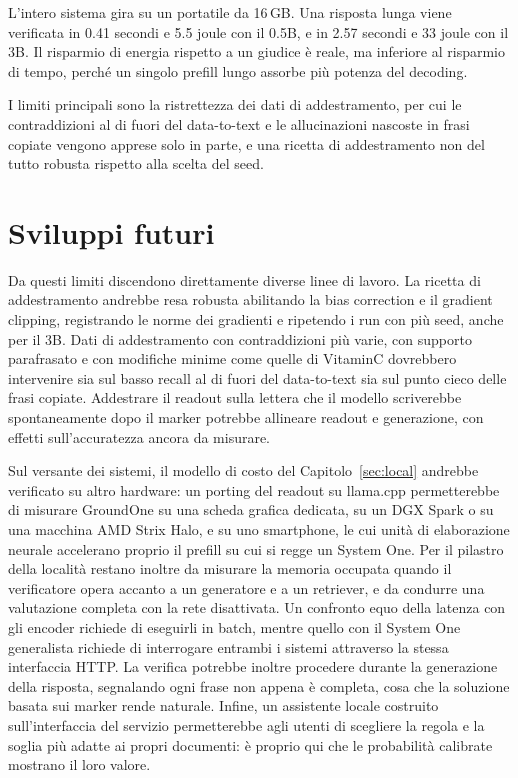 L'intero sistema gira su un portatile da 16\,GB. Una risposta lunga viene verificata in 0.41 secondi e 5.5 joule con il
0.5B, e in 2.57 secondi e 33 joule con il 3B. Il risparmio di energia rispetto a un giudice è reale, ma inferiore al
risparmio di tempo, perché un singolo prefill lungo assorbe più potenza del decoding.

I limiti principali sono la ristrettezza dei dati di addestramento, per cui le contraddizioni al di fuori del
data-to-text e le allucinazioni nascoste in frasi copiate vengono apprese solo in parte, e una ricetta di addestramento
non del tutto robusta rispetto alla scelta del seed.

\section{Sviluppi futuri}
\label{sec:concl-future}

Da questi limiti discendono direttamente diverse linee di lavoro. La ricetta di addestramento andrebbe resa robusta
abilitando la bias correction e il gradient clipping, registrando le norme dei gradienti e ripetendo i run con più seed,
anche per il 3B. Dati di addestramento con contraddizioni più varie, con supporto parafrasato e con modifiche minime come
quelle di VitaminC dovrebbero intervenire sia sul basso recall al di fuori del data-to-text sia sul punto cieco delle
frasi copiate. Addestrare il readout sulla lettera che il modello scriverebbe spontaneamente dopo il marker potrebbe
allineare readout e generazione, con effetti sull'accuratezza ancora da misurare.

Sul versante dei sistemi, il modello di costo del Capitolo~\ref{sec:local} andrebbe verificato su altro hardware: un
porting del readout su llama.cpp permetterebbe di misurare GroundOne su una scheda grafica dedicata, su un DGX Spark o
su una macchina AMD Strix Halo, e su uno smartphone, le cui unità di elaborazione neurale accelerano proprio il prefill
su cui si regge un System One. Per il pilastro della località restano inoltre da misurare la memoria occupata quando il verificatore
opera accanto a un generatore e a un retriever, e da condurre una valutazione completa con la rete disattivata. Un
confronto equo della latenza con gli encoder richiede di eseguirli in batch, mentre quello con il System One generalista
richiede di interrogare entrambi i sistemi attraverso la stessa interfaccia HTTP. La verifica potrebbe inoltre procedere
durante la generazione della risposta, segnalando ogni frase non appena è completa, cosa che la soluzione basata sui
marker rende naturale. Infine, un assistente locale costruito sull'interfaccia del servizio permetterebbe agli utenti di
scegliere la regola e la soglia più adatte ai propri documenti: è proprio qui che le probabilità calibrate mostrano il
loro valore.
